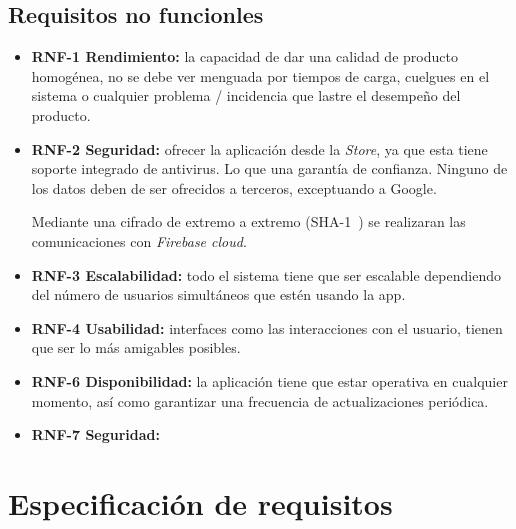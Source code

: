 \subsection{Requisitos no funcionles}
\begin{itemize}
	\tightlist
	\item \textbf{RNF-1 Rendimiento:} la capacidad de dar una calidad de producto homogénea, no se debe ver menguada por tiempos de carga, cuelgues en el sistema o cualquier problema / incidencia que lastre el desempeño del producto.
	\item \textbf{RNF-2 Seguridad:} ofrecer la aplicación desde la \emph{Store}, ya que esta tiene soporte integrado de antivirus. Lo que una garantía de confianza. Ninguno de los datos deben de ser ofrecidos a terceros, exceptuando a Google. 
	
	Mediante una cifrado de extremo a extremo (SHA-1~\cite{wiki:sha1}) se realizaran las comunicaciones con \emph{Firebase cloud}.
	\item \textbf{RNF-3 Escalabilidad:} todo el sistema tiene que ser escalable dependiendo del número de usuarios simultáneos que estén usando la app.
	\item \textbf{RNF-4 Usabilidad:} interfaces como las interacciones con el usuario, tienen que ser lo más amigables posibles.
	\item \textbf{RNF-6 Disponibilidad:} la aplicación tiene que estar operativa en cualquier momento, así como garantizar una frecuencia de actualizaciones periódica.
	\item \textbf{RNF-7 Seguridad:}
\end{itemize}
\section{Especificación de requisitos}


